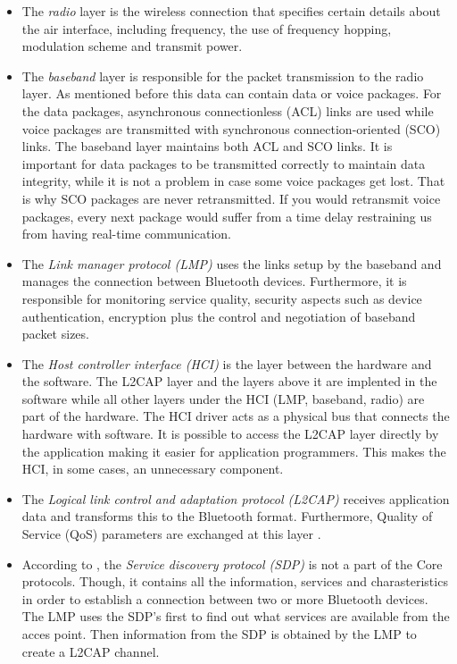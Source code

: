 \documentclass[a4paper, 11pt]{report}
\begin{document}
		\begin{itemize}
			\item The \textit{radio} layer is the wireless connection that specifies certain details about the air interface, including frequency, the use of frequency hopping, modulation scheme and transmit power. 
			\item The \textit{baseband} layer is responsible for the packet transmission to the radio layer. As mentioned before this data can contain data or voice packages. For the data packages, asynchronous connectionless (ACL) links are used while voice packages are transmitted with synchronous connection-oriented (SCO) links. The baseband layer maintains both ACL and SCO links. It is important for data packages to be transmitted correctly to maintain data integrity, while it is not a problem in case some voice packages get lost. That is why SCO packages are never retransmitted. If you would retransmit voice packages, every next package would suffer from a time delay restraining us from having real-time communication.
			\item The \textit{Link manager protocol (LMP)} uses the links setup by the baseband and manages the connection between Bluetooth devices. Furthermore, it is responsible for monitoring service quality, security aspects such as device authentication, encryption plus the control and negotiation of baseband packet sizes.
			\item The \textit{Host controller interface (HCI)} is the layer between the hardware and the software. The L2CAP layer and the layers above it are implented in the software while all other layers under the HCI (LMP, baseband, radio) are part of the hardware. The HCI driver acts as a physical bus that connects the hardware with software. It is possible to access the L2CAP layer directly by the application making it easier for application programmers. This makes the HCI, in some cases, an unnecessary component.
			\item The \textit{Logical link control and adaptation protocol (L2CAP)} receives application data and transforms this to the Bluetooth format. Furthermore, Quality of Service (QoS) parameters are exchanged at this layer \cite{bluetoothStack}.
			\item According to \cite{bluetoothStack}, the \textit{Service discovery protocol (SDP)} is not a part of the Core protocols. Though, it contains all the information, services and charasteristics  in order to establish a connection between two or more Bluetooth devices. The LMP uses the SDP's first to find out what services are available from the acces point. Then information from the SDP is obtained by the LMP to create a L2CAP channel.
		\end{itemize}
		
\end{document}
